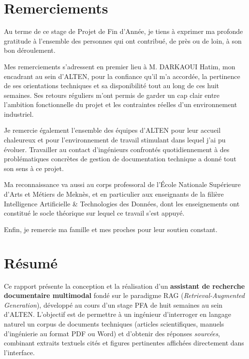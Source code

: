\chapter*{Remerciements}

Au terme de ce stage de Projet de Fin d'Année, je tiens à exprimer ma profonde gratitude à
l'ensemble des personnes qui ont contribué, de près ou de loin, à son bon déroulement.

Mes remerciements s'adressent en premier lieu à M. DARKAOUI Hatim, mon encadrant au sein
d'ALTEN, pour la confiance qu'il m'a accordée, la pertinence de ses orientations techniques
et sa disponibilité tout au long de ces huit semaines. Ses retours réguliers m'ont permis de
garder un cap clair entre l'ambition fonctionnelle du projet et les contraintes réelles d'un
environnement industriel.

Je remercie également l'ensemble des équipes d'ALTEN pour leur accueil chaleureux et pour
l'environnement de travail stimulant dans lequel j'ai pu évoluer. Travailler au contact
d'ingénieurs confrontés quotidiennement à des problématiques concrètes de gestion de
documentation technique a donné tout son sens à ce projet.

Ma reconnaissance va aussi au corps professoral de l'École Nationale Supérieure d'Arts et
Métiers de Meknès, et en particulier aux enseignants de la filière Intelligence Artificielle
\& Technologies des Données, dont les enseignements ont constitué le socle théorique sur
lequel ce travail s'est appuyé.

Enfin, je remercie ma famille et mes proches pour leur soutien constant.

\cleardoublepage
\chapter*{Résumé}

Ce rapport présente la conception et la réalisation d'un \textbf{assistant de recherche
documentaire multimodal} fondé sur le paradigme RAG (\emph{Retrieval-Augmented Generation}),
développé au cours d'un stage PFA de huit semaines au sein d'ALTEN. L'objectif est de
permettre à un ingénieur d'interroger en langage naturel un corpus de documents techniques
(articles scientifiques, manuels d'ingénierie au format PDF ou Word) et d'obtenir des
réponses \emph{sourcées}, combinant extraits textuels cités et figures pertinentes affichées
directement dans l'interface.

